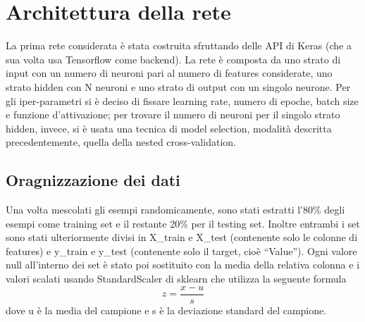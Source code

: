\documentclass[12pt]{report}
\begin{document}
\section{Architettura della rete}
La prima rete considerata è stata costruita sfruttando delle API di Keras (che a sua volta usa Tensorflow come backend). La rete è composta da uno strato di input con un numero di neuroni pari al numero di features considerate, uno strato hidden con N neuroni e uno strato di output con un singolo neurone. Per gli iper-parametri si è deciso di fissare learning rate, numero di epoche, batch size e funzione d'attivazione; per trovare il numero di neuroni per il singolo strato hidden, invece, si è usata una tecnica di model selection, modalità descritta precedentemente, quella della nested cross-validation.

\subsection{Oragnizzazione dei dati}
Una volta mescolati gli esempi randomicamente, sono stati estratti l'80\% degli esempi come training set e il restante 20\% per il testing set. Inoltre entrambi i set sono stati ulteriormente divisi in X\_train e X\_test (contenente solo le colonne di features) e y\_train e y\_test (contenente solo il target, cioè “Value”). Ogni valore null all’interno dei set è stato poi sostituito con la media della relativa colonna e i valori scalati usando StandardScaler di sklearn che utilizza la seguente formula
$$z = \frac{x - u}{s}$$ 
dove u è la media del campione e s è la deviazione standard del campione.
\end{document}
